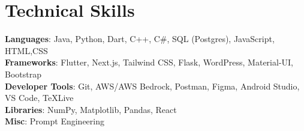 \documentclass[letterpaper,11pt]{article}
\begin{document}
\section{Technical Skills}
 \begin{itemize}[leftmargin=0.15in, label={}]
    \small{\item{
     \textbf{Languages}{: Java, Python, Dart, C++, C\#, SQL (Postgres), JavaScript, HTML,CSS} \\
     \textbf{Frameworks}{: Flutter, Next.js, Tailwind CSS, Flask, WordPress, Material-UI, Bootstrap} \\
     \textbf{Developer Tools}{: Git, AWS/AWS Bedrock, Postman, Figma, Android Studio, VS Code, TeXLive} \\
     \textbf{Libraries}{: NumPy, Matplotlib, Pandas, React} \\
     \textbf{Misc}{: Prompt Engineering}
    }}
 \end{itemize}


\end{document}
